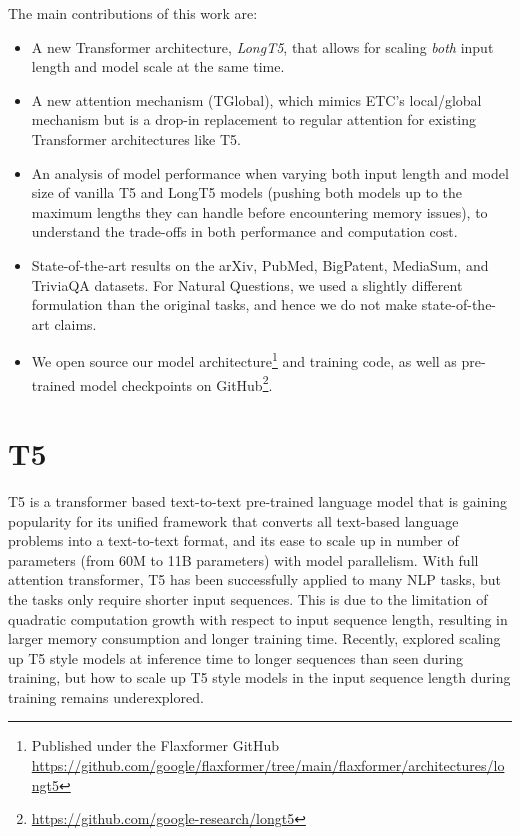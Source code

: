 \documentclass[11pt]{article}
\begin{document}
The main contributions of this work are:
\begin{itemize}
    \item A new Transformer architecture, {\em LongT5}, that allows for scaling {\em both} input length and model scale at the same time.
    \item A new attention mechanism (TGlobal), which mimics ETC's local/global mechanism but is a drop-in replacement to regular attention for existing Transformer architectures like T5.
    \item An analysis of model performance when varying both input length and model size of vanilla T5 and LongT5 models (pushing both models up to the maximum lengths they can handle before encountering memory issues), to understand the trade-offs in both performance and computation cost.
    \item State-of-the-art results on the arXiv, PubMed, BigPatent, MediaSum, and TriviaQA datasets. For Natural Questions, we used a slightly different formulation than the original tasks, and hence we do not make state-of-the-art claims.
    \item We open source our model architecture\footnote{Published under the Flaxformer GitHub \url{https://github.com/google/flaxformer/tree/main/flaxformer/architectures/longt5}} and training code, as well as pre-trained model checkpoints on GitHub\footnote{\url{https://github.com/google-research/longt5}}.
\end{itemize}







\section{T5}\label{sec:t5}
T5 \cite{t5} is a transformer based text-to-text pre-trained language model that is gaining popularity for its unified framework that converts all text-based language problems into a text-to-text format, and its ease to scale up in number of parameters (from 60M to 11B parameters) with model parallelism. With full attention transformer, T5 has been successfully applied to many NLP tasks, but the tasks only require shorter input sequences. This is due to the limitation of quadratic computation growth with respect to input sequence length, resulting in larger memory consumption and longer training time. Recently, \citet{trainshort_testlong} explored scaling up T5 style models at inference time to longer sequences than seen during training, but how to scale up T5 style models in the input sequence length during training remains underexplored.
\end{document}
